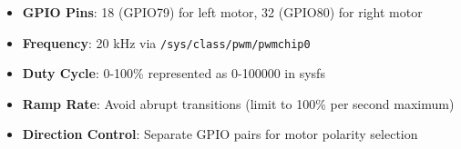 \begin{itemize}
    \item \textbf{GPIO Pins}: 18 (GPIO79) for left motor, 32 (GPIO80) for right motor
    \item \textbf{Frequency}: 20 kHz via \texttt{/sys/class/pwm/pwmchip0}
    \item \textbf{Duty Cycle}: 0-100\% represented as 0-100000 in sysfs
    \item \textbf{Ramp Rate}: Avoid abrupt transitions (limit to 100\% per second maximum)
    \item \textbf{Direction Control}: Separate GPIO pairs for motor polarity selection
\end{itemize}

